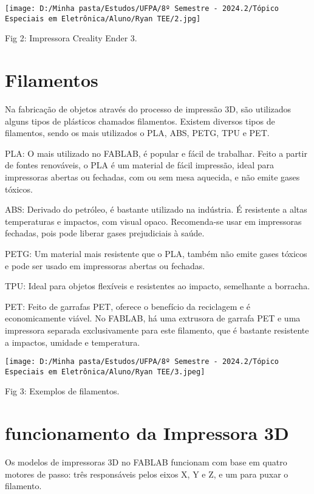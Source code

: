 \documentclass[
]{book}
\begin{document}
\texttt{[image: D:/Minha pasta/Estudos/UFPA/8º Semestre - 2024.2/Tópico Especiais em Eletrônica/Aluno/Ryan TEE/2.jpg]}

Fig 2: Impressora Creality Ender 3.

\section{Filamentos}\label{filamentos}

Na fabricação de objetos através do processo de impressão 3D, são utilizados alguns tipos de plásticos chamados filamentos. Existem diversos tipos de filamentos, sendo os mais utilizados o PLA, ABS, PETG, TPU e PET.

PLA: O mais utilizado no FABLAB, é popular e fácil de trabalhar. Feito a partir de fontes renováveis, o PLA é um material de fácil impressão, ideal para impressoras abertas ou fechadas, com ou sem mesa aquecida, e não emite gases tóxicos.

ABS: Derivado do petróleo, é bastante utilizado na indústria. É resistente a altas temperaturas e impactos, com visual opaco. Recomenda-se usar em impressoras fechadas, pois pode liberar gases prejudiciais à saúde.

PETG: Um material mais resistente que o PLA, também não emite gases tóxicos e pode ser usado em impressoras abertas ou fechadas.

TPU: Ideal para objetos flexíveis e resistentes ao impacto, semelhante a borracha.

PET: Feito de garrafas PET, oferece o benefício da reciclagem e é economicamente viável. No FABLAB, há uma extrusora de garrafa PET e uma impressora separada exclusivamente para este filamento, que é bastante resistente a impactos, umidade e temperatura.

\texttt{[image: D:/Minha pasta/Estudos/UFPA/8º Semestre - 2024.2/Tópico Especiais em Eletrônica/Aluno/Ryan TEE/3.jpeg]}

Fig 3: Exemplos de filamentos.

\section{funcionamento da Impressora 3D}\label{funcionamento-da-impressora-3d}

Os modelos de impressoras 3D no FABLAB funcionam com base em quatro motores de passo: três responsáveis pelos eixos X, Y e Z, e um para puxar o filamento.
\end{document}
